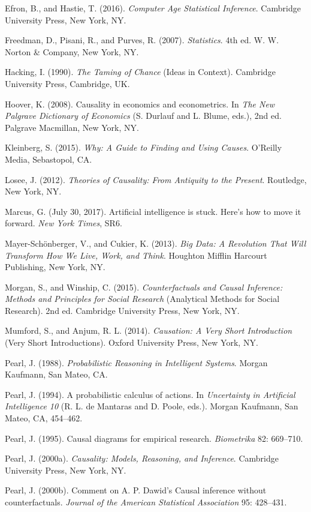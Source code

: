 \documentclass[11pt,a5paper,twoside]{book}
\begin{document}
Efron, B., and Hastie, T. (2016). \textit{Computer Age Statistical Inference}. Cambridge University Press, New York, NY.

Freedman, D., Pisani, R., and Purves, R. (2007). \textit{Statistics}. 4th ed. W. W. Norton \& Company, New York, NY.

Hacking, I. (1990). \textit{The Taming of Chance} (Ideas in Context). Cambridge University Press, Cambridge, UK.

Hoover, K. (2008). Causality in economics and econometrics. In \textit{The New Palgrave Dictionary of Economics} (S. Durlauf and L. Blume, eds.), 2nd ed. Palgrave Macmillan, New York, NY.

Kleinberg, S. (2015). \textit{Why: A Guide to Finding and Using Causes}. O’Reilly Media, Sebastopol, CA.

Losee, J. (2012). \textit{Theories of Causality: From Antiquity to the Present}. Routledge, New York, NY.

Marcus, G. (July 30, 2017). Artificial intelligence is stuck. Here’s how to move it forward. \textit{New York Times}, SR6.

Mayer-Schönberger, V., and Cukier, K. (2013). \textit{Big Data: A Revolution That Will Transform How We Live, Work, and Think}. Houghton Mifflin Harcourt Publishing, New York, NY.

Morgan, S., and Winship, C. (2015). \textit{Counterfactuals and Causal Inference: Methods and Principles for Social Research} (Analytical Methods for Social Research). 2nd ed. Cambridge University Press, New York, NY.

Mumford, S., and Anjum, R. L. (2014). \textit{Causation: A Very Short Introduction} (Very Short Introductions). Oxford University Press, New York, NY.

Pearl, J. (1988). \textit{Probabilistic Reasoning in Intelligent Systems}. Morgan Kaufmann, San Mateo, CA.

Pearl, J. (1994). A probabilistic calculus of actions. In \textit{Uncertainty in Artificial Intelligence 10} (R. L. de Mantaras and D. Poole, eds.). Morgan Kaufmann, San Mateo, CA, 454–462.

Pearl, J. (1995). Causal diagrams for empirical research. \textit{Biometrika} 82: 669–710.

Pearl, J. (2000a). \textit{Causality: Models, Reasoning, and Inference}. Cambridge University Press, New York, NY.

Pearl, J. (2000b). Comment on A. P. Dawid’s Causal inference without counterfactuals. \textit{Journal of the American Statistical Association} 95: 428–431.
\end{document}

